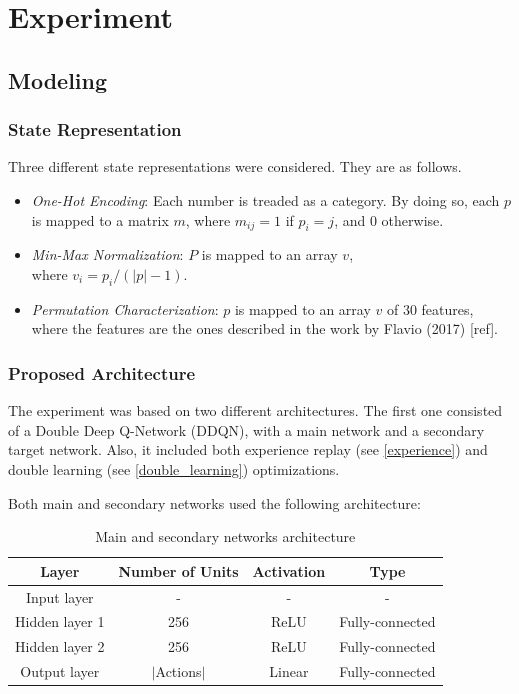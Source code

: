 \documentclass[11pt,twoside]{article}
\begin{document}
\section{Experiment}

\subsection{Modeling}

\subsubsection{State Representation}

Three different state representations were considered. They are as follows.

\begin{itemize}
	\item \textit{One-Hot Encoding}: Each number is treaded as a category. By doing so, each $p$ is mapped to a matrix $m$, where $m_{ij} = 1$ if $p_i = j$, and $0$ otherwise. 
	\item \textit{Min-Max Normalization}: $P$ is mapped to an array $v$,\\ where $v_i = p_i / (|p| - 1)$.
	\item \textit{Permutation Characterization}: $p$ is mapped to an array $v$ of $30$ features, where the features are the ones described in the work by Flavio (2017) [ref].
\end{itemize}

\subsubsection{Proposed Architecture}

The experiment was based on two different architectures. The first one consisted of a Double Deep Q-Network (DDQN), with a main network and a secondary target network. Also, it included both experience replay (see \ref{experience}) and double learning (see \ref{double_learning}) optimizations.

Both main and secondary networks used the following architecture:

\begin{table}[H]
	\begin{center}
		\begin{tabular}{|c|c|c|c|} 
			\hline
			Layer & Number of Units & Activation & Type \\
			\hline\hline
			Input layer & - & - & - \\ 
			\hline
			Hidden layer 1 & 256 & ReLU & Fully-connected\\
			\hline
			Hidden layer 2 & 256 & ReLU & Fully-connected\\
			\hline
			Output layer & $|$Actions$|$ & Linear & Fully-connected\\
			\hline
		\end{tabular}
		\caption{Main and secondary networks architecture}
	\end{center}
\end{table}
\end{document}
